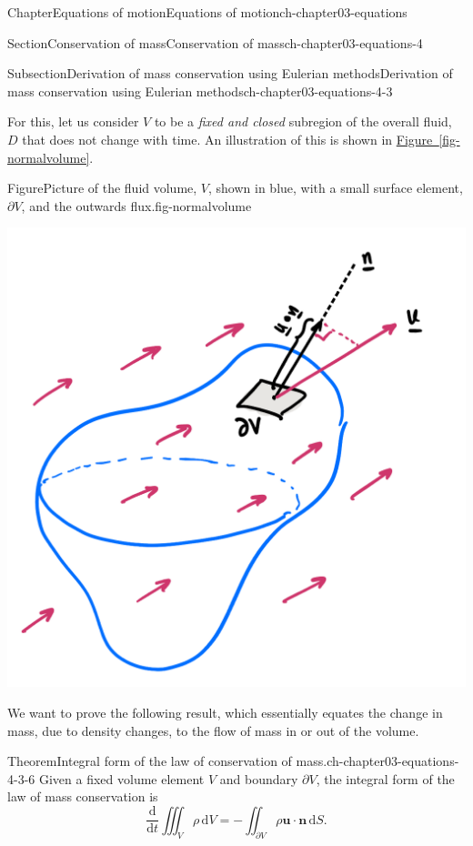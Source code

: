 \documentclass[oneside,10pt,]{book}
\newcommand{\xreffont}{\relax}
\numberwithin{equation}{section}
\newcommand{\de}{\mathrm{d}}
\newcommand{\dd}[2]{\frac{\de#1}{\de#2}}
\newcommand{\bn}{\boldsymbol{n}}
\newcommand{\bu}{\boldsymbol{u}}
\begin{document}
\begin{chapterptx}{Chapter}{Equations of motion}{}{Equations of motion}{}{}{ch-chapter03-equations}
\begin{sectionptx}{Section}{Conservation of mass}{}{Conservation of mass}{}{}{ch-chapter03-equations-4}
\begin{subsectionptx}{Subsection}{Derivation of mass conservation using Eulerian methods}{}{Derivation of mass conservation using Eulerian methods}{}{}{ch-chapter03-equations-4-3}
\par
For this, let us consider \(V\) to be a \emph{fixed and closed} subregion of the overall fluid, \(D\) that does not change with time. An illustration of this is shown in \hyperref[fig-normalvolume]{Figure~{\xreffont\ref{fig-normalvolume}}}.%
\begin{figureptx}{Figure}{Picture of the fluid volume, \(V\), shown in blue, with a small surface element, \(\partial V\), and the outwards flux.}{fig-normalvolume}{}%
\begin{image}{0.2}{0.6}{0.2}{}%
\includegraphics[width=\linewidth]{external/ch-chapter01-equations-09-54-13.png}
\end{image}%
\tcblower
\end{figureptx}%
We want to prove the following result, which essentially equates the change in mass, due to density changes, to the flow of mass in or out of the volume.%
\begin{theorem}{Theorem}{Integral form of the law of conservation of mass.}{}{ch-chapter03-equations-4-3-6}%
Given a fixed volume element \(V\) and boundary \(\partial V\), the integral form of the law of mass conservation is%
\begin{equation}
\dd{}{t} \iiint_V \rho \, \de{V} = -\iint_{\partial V} \rho \bu \cdot \bn \, \de{S}.\label{eqn-integralconservation}
\end{equation}

\end{theorem}
\end{subsectionptx}
\end{sectionptx}
\end{chapterptx}
\end{document}
